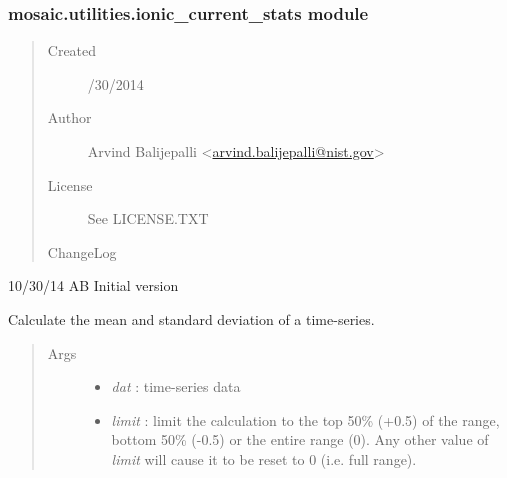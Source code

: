 \documentclass[letterpaper,10pt,english]{sphinxmanual}
\begin{document}
\subsubsection{mosaic.utilities.ionic\_current\_stats module}
\label{api-doc/mosaic.misc:mosaic-utilities-ionic-current-stats-module}\label{api-doc/mosaic.misc:module-mosaic.utilities.ionic_current_stats}\begin{quote}\begin{description}
\item[{Created}] /30/2014

\item[{Author}] \leavevmode
Arvind Balijepalli \textless{}\href{mailto:arvind.balijepalli@nist.gov}{arvind.balijepalli@nist.gov}\textgreater{}

\item[{License}] \leavevmode
See LICENSE.TXT

\item[{ChangeLog}] \leavevmode
\end{description}\end{quote}

\begin{DUlineblock}{0em}
\item[] 10/30/14        AB      Initial version
\end{DUlineblock}

\begin{fulllineitems}
\label{api-doc/mosaic.misc:mosaic.utilities.ionic_current_stats.OpenCurrentDist}
Calculate the mean and standard deviation of a time-series.
\begin{quote}\begin{description}
\item[{Args}] \leavevmode\begin{itemize}
\item {} 
\emph{dat}         : time-series data

\item {} 
\emph{limit}       : limit the calculation to the top 50\% (+0.5) of the range, bottom 50\% (-0.5) or the entire range (0). Any other value of \emph{limit} will cause it to be reset to 0 (i.e. full range).

\end{itemize}

\end{description}\end{quote}

\end{fulllineitems}
\end{document}
